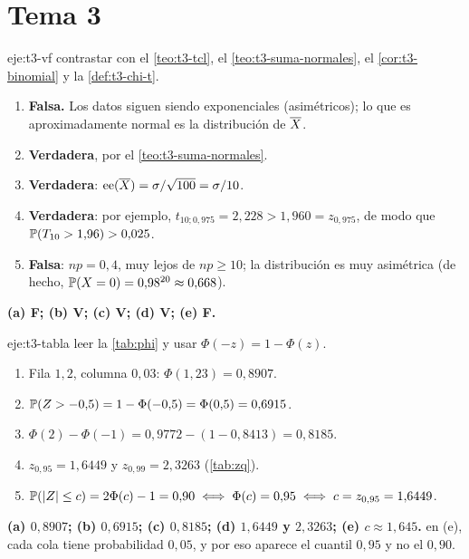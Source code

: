 \section{Tema 3}

\begin{solucion}{eje:t3-vf}
\planteamiento contrastar con el \cref{teo:t3-tcl}, el \cref{teo:t3-suma-normales}, el \cref{cor:t3-binomial} y la \cref{def:t3-chi-t}.
\pasos
\begin{enumerate}[label=(\alph*)]
  \item \textbf{Falsa.} Los datos siguen siendo exponenciales (asimétricos); lo que es aproximadamente normal es la distribución de $\overline{X}$.
  \item \textbf{Verdadera}, por el \cref{teo:t3-suma-normales}.
  \item \textbf{Verdadera}: $\operatorname{ee}(\overline{X})=\sigma/\sqrt{100}=\sigma/10$.
  \item \textbf{Verdadera}: por ejemplo, $t_{10;0{,}975}=2{,}228>1{,}960=z_{0{,}975}$, de modo que $\mathbb{P}(T_{10}>1{,}96)>0{,}025$.
  \item \textbf{Falsa}: $np=0{,}4$, muy lejos de $np\ge10$; la distribución es muy asimétrica (de hecho, $\mathbb{P}(X=0)=0{,}98^{20}\approx0{,}668$).
\end{enumerate}
\resultado \textbf{(a) F; (b) V; (c) V; (d) V; (e) F.}
\end{solucion}

\begin{solucion}{eje:t3-tabla}
\planteamiento leer la \cref{tab:phi} y usar $\Phi(-z)=1-\Phi(z)$.
\pasos
\begin{enumerate}[label=(\alph*)]
  \item Fila $1{,}2$, columna $0{,}03$: $\Phi(1{,}23)=0{,}8907$.
  \item $\mathbb{P}(Z>-0{,}5)=1-\Phi(-0{,}5)=\Phi(0{,}5)=0{,}6915$.
  \item $\Phi(2)-\Phi(-1)=0{,}9772-(1-0{,}8413)=0{,}8185$.
  \item $z_{0{,}95}=1{,}6449$ y $z_{0{,}99}=2{,}3263$ (\cref{tab:zq}).
  \item $\mathbb{P}(\lvert Z\rvert\le c)=2\Phi(c)-1=0{,}90\iff\Phi(c)=0{,}95\iff c=z_{0{,}95}=1{,}6449$.
\end{enumerate}
\resultado \textbf{(a) $0{,}8907$; (b) $0{,}6915$; (c) $0{,}8185$; (d) $1{,}6449$ y $2{,}3263$; (e) $c\approx1{,}645$.}
\comprobacion en (e), cada cola tiene probabilidad $0{,}05$, y por eso aparece el cuantil $0{,}95$ y no el $0{,}90$.
\end{solucion}

